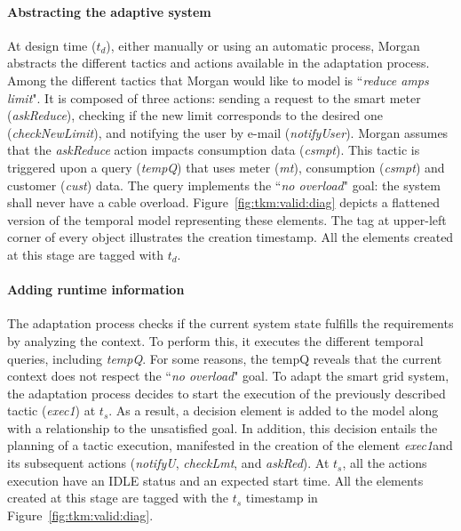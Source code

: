 \paragraph{Abstracting the adaptive system}

At design time ($t_d$), either manually or using an automatic process, Morgan abstracts the different tactics and actions available in the adaptation process.
Among the different tactics that Morgan would like to model is  ``\textit{reduce amps limit}". 
It is composed of three actions: sending a request to the smart meter (\textit{askReduce}), checking if the new limit corresponds to the desired one (\textit{checkNewLimit}), and notifying the user by e-mail (\textit{notifyUser}). 
Morgan assumes that the \textit{askReduce} action impacts consumption data (\textit{csmpt}).
This tactic is triggered upon a query (\textit{tempQ}) that uses meter (\textit{mt}), consumption (\textit{csmpt}) and customer (\textit{cust}) data. The query implements the ``\textit{no overload}" goal: the system shall never have a cable overload. 
Figure~\ref{fig:tkm:valid:diag} depicts a flattened version of the temporal model representing these elements. The tag at upper-left corner of every object illustrates the creation timestamp. All the elements created at this stage are tagged with $t_d$.

\paragraph{Adding runtime information}
The adaptation process checks if the current system state fulfills the requirements by analyzing the context. To perform this, it executes the different temporal queries, including \textit{tempQ}.
For some reasons, the {tempQ} reveals that the current context does not respect the ``\textit{no overload}" goal. To adapt the smart grid system, the adaptation process decides to start the execution of the previously described tactic (\textit{exec1}) at $t_s$. As a result,  
a decision element is added to the model along with a relationship to the unsatisfied goal. In addition, this decision entails the planning of a tactic execution, manifested in the creation of the element \textit{exec1}and its subsequent actions (\textit{notifyU}, \textit{checkLmt}, and \textit{askRed}). At $t_s$, all the actions execution have an IDLE status and an expected start time. All the elements created at this stage are tagged with the $t_s$ timestamp in Figure~\ref{fig:tkm:valid:diag}.

